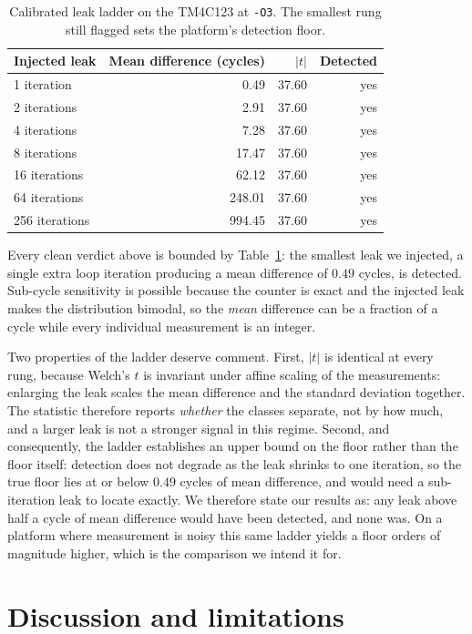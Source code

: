 \documentclass[11pt,a4paper]{article}
\begin{document}
\begin{table}[t]
\centering
\caption{Calibrated leak ladder on the TM4C123 at \texttt{-O3}. The smallest
rung still flagged sets the platform's detection floor.}
\label{tab:ladder}
\begin{tabular}{lrrr}
\toprule
Injected leak & Mean difference (cycles) & $|t|$ & Detected \\
\midrule
1 iteration    & 0.49 & 37.60 & yes \\
2 iterations   & 2.91 & 37.60 & yes \\
4 iterations   & 7.28 & 37.60 & yes \\
8 iterations   & 17.47 & 37.60 & yes \\
16 iterations  & 62.12 & 37.60 & yes \\
64 iterations  & 248.01 & 37.60 & yes \\
256 iterations & 994.45 & 37.60 & yes \\
\bottomrule
\end{tabular}
\end{table}

Every clean verdict above is bounded by Table~\ref{tab:ladder}: the smallest
leak we injected, a single extra loop iteration producing a mean difference of
$0.49$ cycles, is detected. Sub-cycle sensitivity is possible because the
counter is exact and the injected leak makes the distribution bimodal, so the
\emph{mean} difference can be a fraction of a cycle while every individual
measurement is an integer.

Two properties of the ladder deserve comment. First, $|t|$ is identical at every
rung, because Welch's $t$ is invariant under affine scaling of the measurements:
enlarging the leak scales the mean difference and the standard deviation
together. The statistic therefore reports \emph{whether} the classes separate,
not by how much, and a larger leak is not a stronger signal in this regime.
Second, and consequently, the ladder establishes an upper bound on the floor
rather than the floor itself: detection does not degrade as the leak shrinks to
one iteration, so the true floor lies at or below $0.49$ cycles of mean
difference, and would need a sub-iteration leak to locate exactly. We therefore
state our results as: any leak above half a cycle of mean difference would have
been detected, and none was. On a platform where measurement is noisy this same
ladder yields a floor orders of magnitude higher, which is the comparison we
intend it for.

\section{Discussion and limitations}
\end{document}

